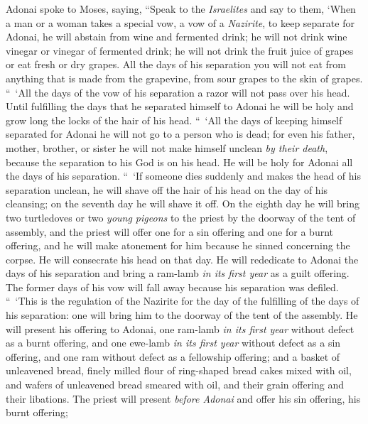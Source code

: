 \begin{biblechapter} %
 Adonai spoke to Moses, saying,
\verse “Speak to the \textit{Israelites} and say to them, ‘When a man or a woman takes a special vow, a vow of a \textit{Nazirite}, to keep separate for Adonai,
\verse he will abstain from wine and fermented drink; he will not drink wine vinegar or vinegar of fermented drink; he will not drink the fruit juice of grapes or eat fresh or dry grapes.
\verse All the days of his separation you will not eat from anything that is made from the grapevine, from sour grapes to the skin of grapes.
\verse “ ‘All the days of the vow of his separation a razor will not pass over his head. Until fulfilling the days that he separated himself to Adonai he will be holy and grow long the locks of the hair of his head.
\verse “ ‘All the days of keeping himself separated for Adonai he will not go to a person who is dead;
\verse for even his father, mother, brother, or sister he will not make himself unclean \textit{by their death}, because the separation to his God is on his head.
\verse He will be holy for Adonai all the days of his separation.
\verse “ ‘If someone dies suddenly and makes the head of his separation unclean, he will shave off the hair of his head on the day of his cleansing; on the seventh day he will shave it off.
\verse On the eighth day he will bring two turtledoves or two \textit{young pigeons} to the priest by the doorway of the tent of assembly,
\verse and the priest will offer one for a sin offering and one for a burnt offering, and he will make atonement for him because he sinned concerning the corpse. He will consecrate his head on that day.
\verse He will rededicate to Adonai the days of his separation and bring a ram-lamb \textit{in its first year} as a guilt offering. The former days of his vow will fall away because his separation was defiled.
\verse “ ‘This is the regulation of the Nazirite for the day of the fulfilling of the days of his separation: one will bring him to the doorway of the tent of the assembly.
\verse He will present his offering to Adonai, one ram-lamb \textit{in its first year} without defect as a burnt offering, and one ewe-lamb \textit{in its first year} without defect as a sin offering, and one ram without defect as a fellowship offering;
\verse and a basket of unleavened bread, finely milled flour of ring-shaped bread cakes mixed with oil, and wafers of unleavened bread smeared with oil, and their grain offering and their libations.
\verse The priest will present \textit{before Adonai} and offer his sin offering, his burnt offering;

\end{biblechapter}
